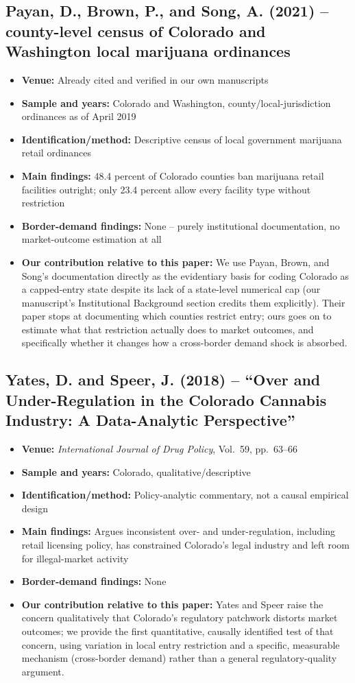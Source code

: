 \documentclass[11pt]{article}
\begin{document}
\subsection{Payan, D., Brown, P., and Song, A. (2021) -- county-level census of Colorado and Washington local
marijuana ordinances}
\begin{itemize}
\item \textbf{Venue:} Already cited and verified in our own manuscripts
\item \textbf{Sample and years:} Colorado and Washington, county/local-jurisdiction ordinances as of April 2019
\item \textbf{Identification/method:} Descriptive census of local government marijuana retail ordinances
\item \textbf{Main findings:} 48.4 percent of Colorado counties ban marijuana retail facilities outright; only
23.4 percent allow every facility type without restriction
\item \textbf{Border-demand findings:} None -- purely institutional documentation, no market-outcome
estimation at all
\item \textbf{Our contribution relative to this paper:} We use Payan, Brown, and Song's documentation directly
as the evidentiary basis for coding Colorado as a capped-entry state despite its lack of a state-level
numerical cap (our manuscript's Institutional Background section credits them explicitly). Their paper stops
at documenting which counties restrict entry; ours goes on to estimate what that restriction actually does to
market outcomes, and specifically whether it changes how a cross-border demand shock is absorbed.
\end{itemize}

\subsection{Yates, D. and Speer, J. (2018) -- ``Over and Under-Regulation in the Colorado Cannabis Industry:
A Data-Analytic Perspective''}
\begin{itemize}
\item \textbf{Venue:} \emph{International Journal of Drug Policy}, Vol.\ 59, pp.\ 63--66
\item \textbf{Sample and years:} Colorado, qualitative/descriptive
\item \textbf{Identification/method:} Policy-analytic commentary, not a causal empirical design
\item \textbf{Main findings:} Argues inconsistent over- and under-regulation, including retail licensing
policy, has constrained Colorado's legal industry and left room for illegal-market activity
\item \textbf{Border-demand findings:} None
\item \textbf{Our contribution relative to this paper:} Yates and Speer raise the concern qualitatively that
Colorado's regulatory patchwork distorts market outcomes; we provide the first quantitative, causally
identified test of that concern, using variation in local entry restriction and a specific, measurable
mechanism (cross-border demand) rather than a general regulatory-quality argument.
\end{itemize}
\end{document}
